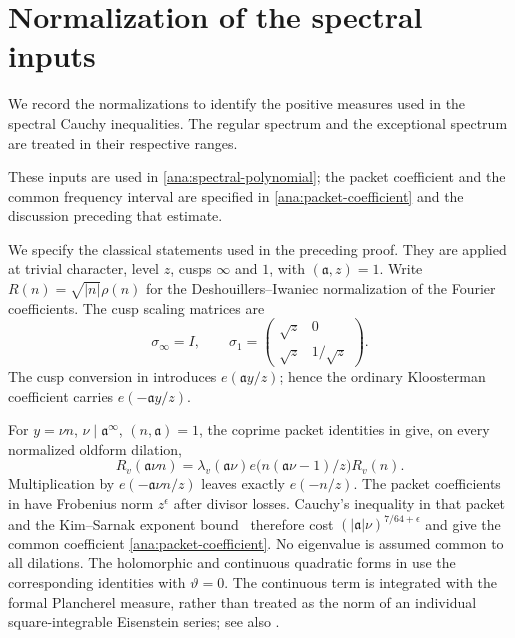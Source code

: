 \section{Normalization of the spectral inputs}
\label{app:classical}

We record the normalizations to identify the positive measures used
in the spectral Cauchy inequalities. The regular spectrum and the
exceptional spectrum are treated in their respective ranges.

These inputs are used in \eqref{ana:spectral-polynomial}; the packet coefficient and the common frequency interval are specified in \eqref{ana:packet-coefficient} and the discussion preceding that estimate.

We specify the classical statements used in the preceding proof.
They are applied at trivial character, level $z$, cusps $\infty$ and
$1$, with $(\mathfrak{a},z)=1$. Write
$R(n)=\sqrt{|n|}\rho(n)$ for the Deshouillers--Iwaniec normalization
of the Fourier coefficients. The cusp scaling matrices are
\[
 \sigma_\infty=I,\qquad
 \sigma_1=\begin{pmatrix}\sqrt z&0\\\sqrt z&1/\sqrt z\end{pmatrix}.
\]
The cusp conversion in \cite[Lemma 4.3]{Drappeau} introduces
$e(\mathfrak{a}y/z)$; hence the ordinary Kloosterman coefficient carries
$e(-\mathfrak{a}y/z)$.

For $y=\nu n$, $\nu\mid \mathfrak{a}^\infty$, $(n,\mathfrak{a})=1$, the coprime packet
identities in \cite[Lemmas 3.1 and 3.2]{ABL} give, on every normalized
oldform dilation,
\[
 R_v(\mathfrak{a}\nu n)=\lambda_v(\mathfrak{a}\nu)
                   e\bigl(n(\mathfrak{a}\nu-1)/z\bigr)R_v(n).
\]
Multiplication by $e(-\mathfrak{a}\nu n/z)$ leaves exactly $e(-n/z)$.
The packet coefficients in \cite[(3.3)]{ABL} have Frobenius norm
$z^\epsilon$ after divisor losses. Cauchy's inequality in that packet
and the Kim--Sarnak exponent bound~\cite{KimSarnak} therefore cost
$(|\mathfrak{a}|\nu)^{7/64+\epsilon}$ and give the common coefficient
\eqref{ana:packet-coefficient}. No eigenvalue is assumed common to
all dilations. The holomorphic and continuous quadratic forms in
\cite[Lemma 3.2]{ABL} use the corresponding identities with
$\vartheta=0$. The continuous term is integrated with the formal
Plancherel measure, rather than treated as the norm of an individual
square-integrable Eisenstein series; see also
\cite[Proposition 8.2]{Young}.

